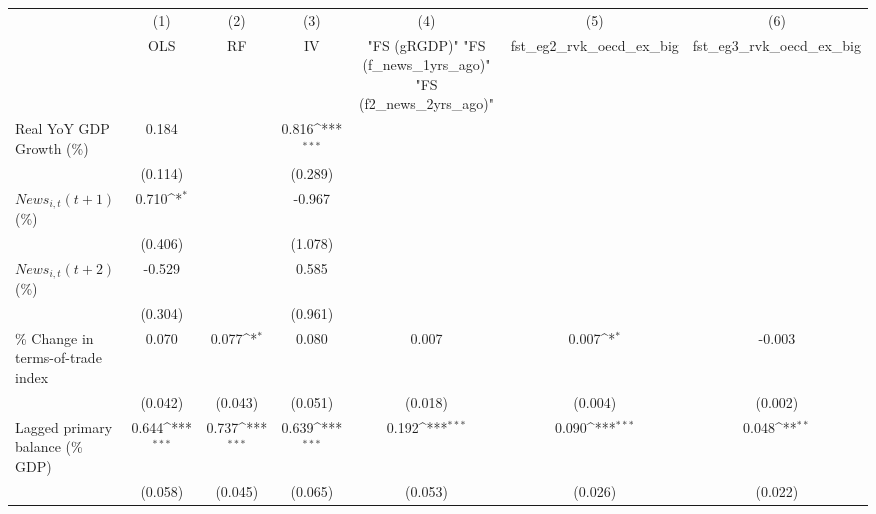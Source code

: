 {
\def\sym#1{\ifmmode^{#1}\else\(^{#1}\)\fi}
\begin{tabular}{l*{6}{c}}
\toprule
                    &\multicolumn{1}{c}{(1)}&\multicolumn{1}{c}{(2)}&\multicolumn{1}{c}{(3)}&\multicolumn{1}{c}{(4)}&\multicolumn{1}{c}{(5)}&\multicolumn{1}{c}{(6)}\\
                    &\multicolumn{1}{c}{OLS}&\multicolumn{1}{c}{RF}&\multicolumn{1}{c}{IV}&\multicolumn{1}{c}{ "FS (gRGDP)"  "FS (f_news_1yrs_ago)"  "FS (f2_news_2yrs_ago)" }&\multicolumn{1}{c}{fst_eg2_rvk_oecd_ex_big}&\multicolumn{1}{c}{fst_eg3_rvk_oecd_ex_big}\\
\midrule
Real YoY GDP Growth (\%)&       0.184         &                     &       0.816\sym{***}&                     &                     &                     \\
                    &     (0.114)         &                     &     (0.289)         &                     &                     &                     \\
\addlinespace
$ News_{i,t}(t+1)$ (\%)&       0.710\sym{*}  &                     &      -0.967         &                     &                     &                     \\
                    &     (0.406)         &                     &     (1.078)         &                     &                     &                     \\
\addlinespace
$ News_{i,t}(t+2)$ (\%)&      -0.529         &                     &       0.585         &                     &                     &                     \\
                    &     (0.304)         &                     &     (0.961)         &                     &                     &                     \\
\addlinespace
\% Change in terms-of-trade index&       0.070         &       0.077\sym{*}  &       0.080         &       0.007         &       0.007\sym{*}  &      -0.003         \\
                    &     (0.042)         &     (0.043)         &     (0.051)         &     (0.018)         &     (0.004)         &     (0.002)         \\
\addlinespace
Lagged primary balance (\% GDP)&       0.644\sym{***}&       0.737\sym{***}&       0.639\sym{***}&       0.192\sym{***}&       0.090\sym{***}&       0.048\sym{**} \\
                    &     (0.058)         &     (0.045)         &     (0.065)         &     (0.053)         &     (0.026)         &     (0.022)         \\

\end{tabular}}
